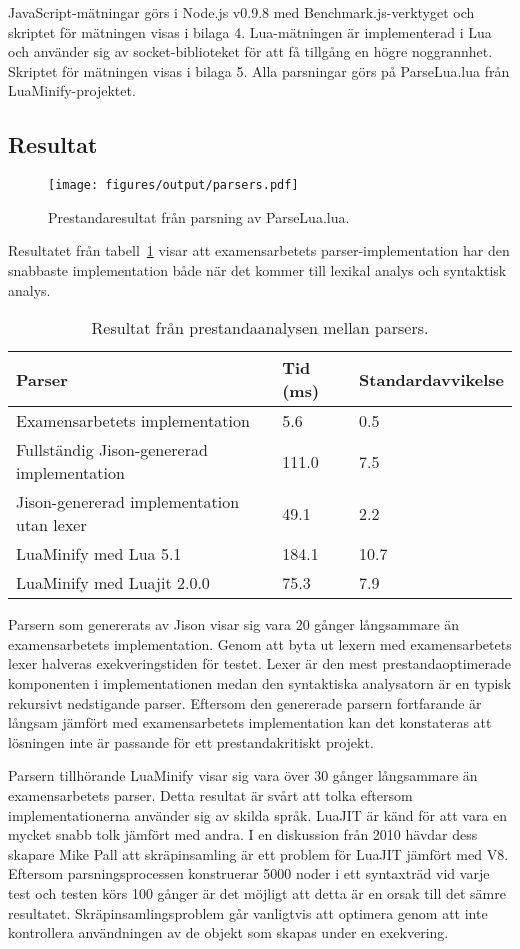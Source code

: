JavaScript-mätningar görs i Node.js v0.9.8 med Benchmark.js-verktyget och skriptet
för mätningen visas i bilaga 4. Lua-mätningen är implementerad i Lua och
använder sig av socket-biblioteket för att få tillgång en högre noggrannhet.
Skriptet för mätningen visas i bilaga 5. Alla parsningar görs på ParseLua.lua
från LuaMinify-projektet.

\subsection{Resultat}

\begin{figure}[ht]
  \texttt{[image: figures/output/parsers.pdf]}
  \caption{Prestandaresultat från parsning av ParseLua.lua.}
\end{figure}

Resultatet från tabell~\ref{tab:parsers} visar att examensarbetets
parser-implementation har den snabbaste implementation både när det kommer
till lexikal analys och syntaktisk analys.

\begin{table}[ht]
  \caption{Resultat från prestandaanalysen mellan parsers.}
  \begin{tabular}{l l l}
    Parser & Tid (ms) & Standardavvikelse \\
    \hline
    Examensarbetets implementation & 5.6 & 0.5 \\
    Fullständig Jison-genererad implementation & 111.0 & 7.5 \\
    Jison-genererad implementation utan lexer & 49.1 & 2.2 \\
    LuaMinify med Lua 5.1 & 184.1 & 10.7 \\
    LuaMinify med Luajit 2.0.0 & 75.3 & 7.9
  \end{tabular}
  \label{tab:parsers}
\end{table}


Parsern som genererats av Jison visar sig vara 20 gånger långsammare än
examensarbetets implementation.  Genom att byta ut lexern med examensarbetets
lexer halveras exekveringstiden för testet. Lexer är den mest
prestandaoptimerade komponenten i implementationen medan den syntaktiska
analysatorn är en typisk rekursivt nedstigande parser. Eftersom den
genererade parsern fortfarande är långsam jämfört med examensarbetets
implementation kan det konstateras att lösningen inte är passande för ett
prestandakritiskt projekt.

Parsern tillhörande LuaMinify visar sig vara över 30 gånger långsammare än
examensarbetets parser. Detta resultat är svårt att tolka eftersom
implementationerna använder sig av skilda språk. LuaJIT är känd för att vara
en mycket snabb tolk jämfört med andra. I en diskussion från 2010 hävdar dess
skapare Mike Pall \citep{mp10} att skräpinsamling är ett problem för LuaJIT
jämfört med V8. Eftersom parsningsprocessen konstruerar 5000 noder i ett
syntaxträd vid varje test och testen körs 100 gånger är det möjligt att detta
är en orsak till det sämre resultatet. Skräpinsamlingsproblem går vanligtvis
att optimera genom att inte kontrollera användningen av de objekt som skapas
under en exekvering.

